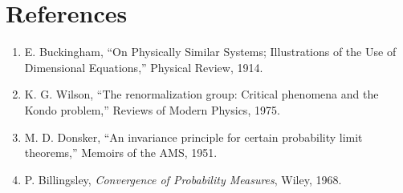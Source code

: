 \documentclass[10pt,journal,compsoc]{IEEEtran}
\begin{document}
\section*{References}
\begin{small}
\begin{enumerate}
    \item E. Buckingham, ``On Physically Similar Systems; Illustrations of the Use of Dimensional Equations,'' Physical Review, 1914.
    \item K. G. Wilson, ``The renormalization group: Critical phenomena and the Kondo problem,'' Reviews of Modern Physics, 1975.
    \item M. D. Donsker, ``An invariance principle for certain probability limit theorems,'' Memoirs of the AMS, 1951.
    \item P. Billingsley, \textit{Convergence of Probability Measures}, Wiley, 1968.
\end{enumerate}
\end{small}
\end{document}
